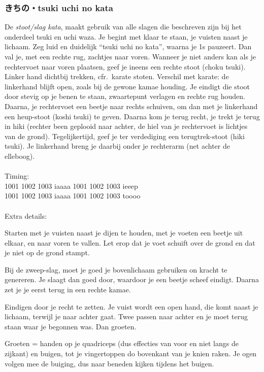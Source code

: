 \subsubsection{きちの・tsuki uchi no kata}
De \textit{stoot/slag kata}, maakt gebruik van alle slagen die beschreven zijn bij het onderdeel tsuki en uchi waza. Je begint met klaar te staan, je vuisten naast je lichaam. Zeg luid en duidelijk ``tsuki uchi no kata'', waarna je 1s pauzeert. Dan val je, met een rechte rug, zachtjes naar voren. Wanneer je niet anders kan als je rechtervoet naar voren plaatsen, geef je ineens een rechte stoot (choku tsuki). Linker hand dichtbij trekken, cfr.\ karate stoten. Verschil met karate: de linkerhand blijft open, zoals bij de gewone kamae houding. Je eindigt die stoot door stevig op je benen te staan, zwaartepunt verlagen en rechte rug houden. Daarna, je rechtervoet een beetje naar rechts schuiven, om dan met je linkerhand een heup-stoot (koshi tsuki) te geven. Daarna kom je terug recht, je trekt je terug in hiki (rechter been geplooid naar achter, de hiel van je rechtervoet is lichtjes van de grond). Tegelijkertijd, geef je ter verdediging een terugtrek-stoot (hiki tsuki). Je linkerhand breng je daarbij onder je rechterarm (net achter de elleboog).\\
\\
Timing:\\
1001 1002 1003 iaaaa 1001 1002 1003 ieeep\\
1001 1002 1003 iaaaa 1001 1002 1003 toooo\\
\\
Extra details:
\begin{itemize}
    \begin{item}
    Starten met je vuisten naast je dijen te houden, met je voeten een beetje uit elkaar, en naar voren te vallen. Let erop dat je voet schuift over de grond en dat je niet op de grond stampt.
    \end{item}
    \begin{item}
    Bij de zweep-slag, moet je goed je bovenlichaam gebruiken on kracht te genereren. Je slaagt dan goed door, waardoor je een beetje scheef eindigt. Daarna zet je je eerst terug in een rechte kamae.
    \end{item}
    \begin{item}
    Eindigen door je recht te zetten. Je vuist wordt een open hand, die komt naast je lichaam, terwijl je naar achter gaat. Twee passen naar achter en je moet terug staan waar je begonnen was. Dan groeten.
    \end{item}
    \begin{item}
    Groeten = handen op je quadriceps (dus effecties van voor en niet langs de zijkant) en buigen, tot je vingertoppen do bovenkant van je knien raken.
    Je ogen volgen mee de buiging, dus naar beneden kijken tijdens het buigen.
    \end{item}
\end{itemize}
